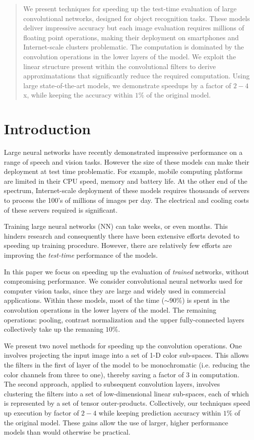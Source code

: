 
\begin{abstract}
We present techniques for speeding up the test-time evaluation of large convolutional networks, designed for object recognition tasks. These models deliver impressive accuracy but each image evaluation requires millions of floating point operations, making their deployment on smartphones and Internet-scale clusters problematic. The computation is dominated by the convolution operations in the lower layers of the model. We exploit the linear structure present within the 
convolutional filters to derive approximatations that significantly reduce the required computation. Using large state-of-the-art models, we demonstrate speedups by a factor of $2-4$x, while keeping the accuracy within $1\%$ of the original model. 
\end{abstract}

\section{Introduction}

Large neural networks have recently demonstrated impressive
performance on a range of speech and vision tasks. However the size of
these models can make their deployment at test time problematic. For
example, mobile computing platforms are limited in their CPU speed,
memory and battery life. At the other end of the spectrum,
Internet-scale deployment of these models requires thousands of
servers to process the 100's of millions of images per day. The
electrical and cooling costs of these servers required is significant.

Training large neural networks (NN) can take weeks, or even
months. This hinders research and consequently there have been
extensive efforts devoted to speeding up training procedure.  However,
there are relatively few efforts are improving the {\em test-time}
performance of the models. 

In this paper we focus on speeding up the
evaluation of {\em trained} networks, without compromising
performance. We consider convolutional neural networks used for
computer vision tasks, since they are large and widely used in
commercial applications. Within these models, most of the time ($\sim90\%$) is spent in the
convolution operations in the lower layers of the model. The remaining
operations: pooling, contrast normalization and the upper
fully-connected layers collectively take up the remaning $10\%$.

We present two novel methods for speeding up the convolution
operations. One involves projecting the input image into a set of 1-D
color sub-spaces. This allows the filters in the first of layer of the
model to be monochromatic (i.e. reducing the color channels from three
to one), thereby saving a factor of 3 in computation. The second
approach, applied to subsequent convolution layers, involves
clustering the filters into a set of low-dimensional linear
sub-spaces, each of which is represented by a set of tensor
outer-products. Collectively, our techniques speed up execution by
factor of $2-4$ while keeping prediction accuracy within $1\%$ of the
original model. These gains allow the use of larger, higher
performance models than would otherwise be practical.


